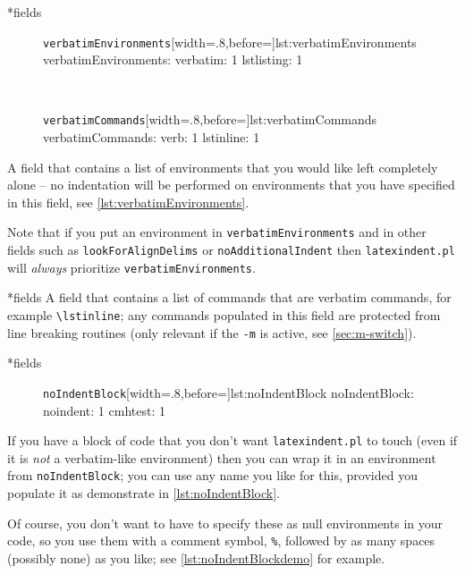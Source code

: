 \documentclass[10pt]{article}
\begin{document}
*{fields} 

\begin{figure}
\begin{yaml}{\texttt{verbatimEnvironments}}[width=.8\linewidth,before=\centering]{lst:verbatimEnvironments}
verbatimEnvironments:
    verbatim: 1
    lstlisting: 1
	\end{yaml}\\
    \vspace{.2cm}
\begin{yaml}{\texttt{verbatimCommands}}[width=.8\linewidth,before=\centering]{lst:verbatimCommands}
verbatimCommands:
    verb: 1
    lstinline: 1
\end{yaml}
\end{figure}
A field that contains a list of environments
that you would like left completely alone -- no indentation will be performed
on environments that you have specified in this field, see \cref{lst:verbatimEnvironments}.

Note that if  you put an environment in \texttt{verbatimEnvironments}
and in other fields such as \texttt{lookForAlignDelims} or \texttt{noAdditionalIndent}
then \texttt{latexindent.pl} will \emph{always} prioritize \texttt{verbatimEnvironments}.

*{fields}
A field that contains a list of commands that are verbatim commands, for example
\lstinline|\lstinline|; any commands populated in this field are protected from line breaking 
routines (only relevant if the \texttt{-m} is active, see \vref{sec:m-switch}).

*{fields} 

\begin{figure}
\begin{yaml}{\texttt{noIndentBlock}}[width=.8\linewidth,before=\centering]{lst:noIndentBlock}
noIndentBlock:
    noindent: 1
    cmhtest: 1
	\end{yaml}
\end{figure}
If you have a block of code that you don't want \texttt{latexindent.pl} to touch (even if it is \emph{not} a verbatim-like
environment) then you can wrap it in an environment from \texttt{noIndentBlock};
you can use any name you like for this, provided you populate it as demonstrate in
\cref{lst:noIndentBlock}.

Of course, you don't want to have to specify these as null environments
in your code, so you use them with a comment symbol, \lstinline!%!, followed
by as many spaces (possibly none) as you like; see \cref{lst:noIndentBlockdemo} for
example.
\end{document}
